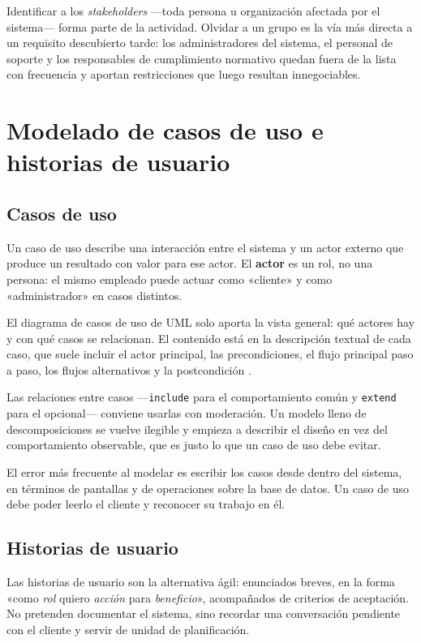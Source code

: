 Identificar a los \emph{stakeholders} —toda persona u organización afectada por el
sistema— forma parte de la actividad. Olvidar a un grupo es la vía más directa a
un requisito descubierto tarde: los administradores del sistema, el personal de
soporte y los responsables de cumplimiento normativo quedan fuera de la lista con
frecuencia y aportan restricciones que luego resultan innegociables.

\section{Modelado de casos de uso e historias de usuario}

\subsection*{Casos de uso}

Un caso de uso describe una interacción entre el sistema y un actor externo que
produce un resultado con valor para ese actor. El \textbf{actor} es un rol, no una
persona: el mismo empleado puede actuar como «cliente» y como «administrador» en
casos distintos.

El diagrama de casos de uso de UML solo aporta la vista general: qué actores hay y
con qué casos se relacionan. El contenido está en la descripción textual de cada
caso, que suele incluir el actor principal, las precondiciones, el flujo
principal paso a paso, los flujos alternativos y la postcondición
\cite{arlow2006,larman2006}.

Las relaciones entre casos —\texttt{include} para el comportamiento común y
\texttt{extend} para el opcional— conviene usarlas con moderación. Un modelo lleno
de descomposiciones se vuelve ilegible y empieza a describir el diseño en vez del
comportamiento observable, que es justo lo que un caso de uso debe evitar.

El error más frecuente al modelar es escribir los casos desde dentro del sistema,
en términos de pantallas y de operaciones sobre la base de datos. Un caso de uso
debe poder leerlo el cliente y reconocer su trabajo en él.

\subsection*{Historias de usuario}

Las historias de usuario son la alternativa ágil: enunciados breves, en la forma
«como \emph{rol} quiero \emph{acción} para \emph{beneficio}», acompañados de
criterios de aceptación. No pretenden documentar el sistema, sino recordar una
conversación pendiente con el cliente y servir de unidad de planificación.

